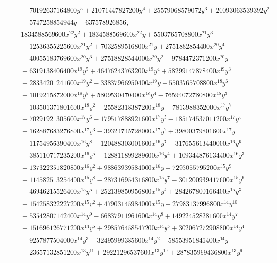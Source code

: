 \documentclass[11pt]{article}
\begin{document}
\begin{longtable}{@{}ll@{}}
 & $\quad +70192637164800y^{5}+21071447827200y^{4}+25579068579072y^{3}+20093063539392y^{2}$\\
 & $\quad +5747258854944y+637578926856,$\\
 & $\quad 1834588569600x^{22}y^{2}+1834588569600x^{22}y+5503765708800x^{21}y^{3}$\\
 & $\quad +12536355225600x^{21}y^{2}+7032589516800x^{21}y+2751882854400x^{20}y^{4}$\\
 & $\quad +40055183769600x^{20}y^{3}+27518828544000x^{20}y^{2}-9784472371200x^{20}y$\\
 & $\quad -6319138406400x^{19}y^{5}+46476243763200x^{19}y^{4}+58299147878400x^{19}y^{3}$\\
 & $\quad -28334201241600x^{19}y^{2}-33837966950400x^{19}y-5503765708800x^{18}y^{6}$\\
 & $\quad -1019215872000x^{18}y^{5}+5809530470400x^{18}y^{4}-76594072780800x^{18}y^{3}$\\
 & $\quad -103501371801600x^{18}y^{2}-25582318387200x^{18}y+7813988352000x^{17}y^{7}$\\
 & $\quad -70291921305600x^{17}y^{6}-179517888921600x^{17}y^{5}-185174537011200x^{17}y^{4}$\\
 & $\quad -162887683276800x^{17}y^{3}-39324745728000x^{17}y^{2}+39800379801600x^{17}y$\\
 & $\quad +11754956390400x^{16}y^{8}-120488303001600x^{16}y^{7}-317655613440000x^{16}y^{6}$\\
 & $\quad -385110717235200x^{16}y^{5}-128811899289600x^{16}y^{4}+109344876134400x^{16}y^{3}$\\
 & $\quad +137322351820800x^{16}y^{2}+98863939584000x^{16}y-7293055795200x^{15}y^{9}$\\
 & $\quad -114582513254400x^{15}y^{8}-287316954316800x^{15}y^{7}-301200939417600x^{15}y^{6}$\\
 & $\quad -46946215526400x^{15}y^{5}+252139850956800x^{15}y^{4}+284267800166400x^{15}y^{3}$\\
 & $\quad +154258322227200x^{15}y^{2}+47903145984000x^{15}y-27983137996800x^{14}y^{10}$\\
 & $\quad -53542807142400x^{14}y^{9}-66837911961600x^{14}y^{8}+149224528281600x^{14}y^{7}$\\
 & $\quad +151696126771200x^{14}y^{6}+298576458547200x^{14}y^{5}+302067272908800x^{14}y^{4}$\\
 & $\quad -9257877504000x^{14}y^{3}-32495999385600x^{14}y^{2}-58553951846400x^{14}y$\\
 & $\quad -23657132851200x^{13}y^{11}+29221296537600x^{13}y^{10}+287835999436800x^{13}y^{9}$\\

\end{longtable}
\end{document}
